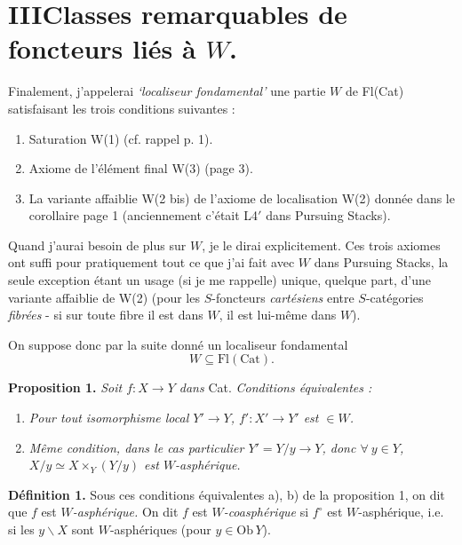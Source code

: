 \documentclass[11pt,leqno]{article}
\newcommand{\printedpage}[1]{\marginpar{\footnotesize p.~#1}}
\newcommand{\msp}[1]{\marginpar{\footnotesize [#1]}}
\newcommand{\Ob}{\mathrm{Ob}\,}
\begin{document}
\printedpage{19}

\section*{III\quad Classes remarquables de foncteurs liés à $W$.}

Finalement, j'appelerai \textit{‘localiseur fondamental’} une partie $W$ de Fl(Cat) satisfaisant les trois conditions suivantes : %

\begin{enumerate}
\item[(i)] Saturation W(1) (cf. rappel p. 1).
\item[(ii)] Axiome de l'élément final W(3) (page 3).
\item[(iii)] La variante affaiblie W(2 bis) de l'axiome de localisation W(2) donnée dans le corollaire page 1 (anciennement c'était L4$'$ dans Pursuing Stacks).
\end{enumerate}

Quand j'aurai besoin de plus sur $W$, je le dirai explicitement. Ces trois axiomes ont suffi pour pratiquement tout ce que j'ai fait avec $W$ dans Pursuing Stacks, la seule exception étant un usage (si je me rappelle) unique, quelque part, d'une variante affaiblie de W(2) (pour les $S$-foncteurs \textit{cartésiens} entre $S$-catégories \textit{fibrées} - si sur toute fibre il est dans $W$, il est lui-même dans $W$).

On suppose donc par la suite donné un localiseur fondamental
\[
W \subseteq \mathrm{Fl}(\mathrm{Cat}).
\]

\textbf{Proposition 1.} \textit{Soit $f : X \longrightarrow Y$ dans} \textup{Cat}. \textit{Conditions équivalentes :}

\begin{enumerate}
\item[\textit{a)}] \textit{Pour tout isomorphisme local $Y' \longrightarrow Y$, $f' : X' \longrightarrow Y'$ est $\in W$.}
\item[\textit{b)}] \textit{Même condition, dans le cas particulier $Y' = Y/y \longrightarrow Y$, donc $\forall\ y \in Y$, $X/y \simeq X \times_Y (Y/y)$ est $W$-asphérique.}
\end{enumerate}

\msp{page 23}\textbf{Définition 1.} Sous ces conditions équivalentes a), b) de la proposition 1, on dit que $f$ est \textit{$W$-asphérique.} On dit $f$ est \textit{$W$-coasphérique} si $f^{\circ}$ est $W$-asphérique, i.e. si les $y\backslash X$ sont $W$-asphériques (pour $y \in \Ob Y$).
\end{document}
